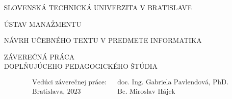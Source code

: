 \thispagestyle{empty}
{\centering
	{\Large \MakeUppercase{Slovenská technická univerzita v Bratislave}} \par
	\vspace{\bigskipamount}
	{\Large  \MakeUppercase{Ústav Manažmentu}}
	\vfill
	{{\Large \MakeUppercase{Návrh učebného textu v predmete Informatika}} \par
	\vspace{2\bigskipamount}
	{\Large \MakeUppercase{Záverečná práca \\ Doplňujúceho pedagogického štúdia}}}
	\vfill
}
{\large 
\begin{flushleft}
\begin{align*}
& \text{Vedúci záverečnej práce:} && \text{doc. Ing. Gabriela Pavlendová, PhD.} \\
& \text{Bratislava, 2023} && \text{Bc. Miroslav Hájek}
\end{align*}
\end{flushleft}
}%
